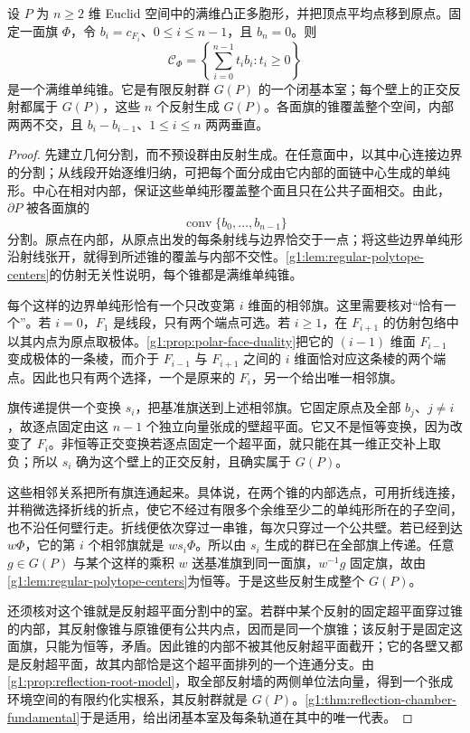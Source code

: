 \begin{theorem}
	\label{g1:thm:regular-polytope-flag-chambers}
	设 \(P\) 为 \(n\ge2\) 维 Euclid 空间中的满维凸正多胞形，并把顶点平均点移到原点。固定一面旗 \(\Phi\)，令 \(b_i=c_{F_i}\)、\(0\le i\le n-1\)，且 \(b_n=0\)。则
	\[
		\mathcal C_\Phi=\left\{\sum_{i=0}^{n-1}t_i b_i:t_i\ge0\right\}
	\]
	是一个满维单纯锥。它是有限反射群 \(G(P)\) 的一个闭基本室；每个壁上的正交反射都属于 \(G(P)\)，这些 \(n\) 个反射生成 \(G(P)\)。各面旗的锥覆盖整个空间，内部两两不交，且 \(b_i-b_{i-1}\)、\(1\le i\le n\) 两两垂直。
\end{theorem}
\begin{proof}
	先建立几何分割，而不预设群由反射生成。在任意面中，以其中心连接边界的分割；从线段开始逐维归纳，可把每个面分成由它内部的面链中心生成的单纯形。中心在相对内部，保证这些单纯形覆盖整个面且只在公共子面相交。由此，\(\partial P\) 被各面旗的
	\[
		\operatorname{conv}\{b_0,\ldots,b_{n-1}\}
	\]
	分割。原点在内部，从原点出发的每条射线与边界恰交于一点；将这些边界单纯形沿射线张开，就得到所述锥的覆盖与内部不交性。\cref{g1:lem:regular-polytope-centers}的仿射无关性说明，每个锥都是满维单纯锥。

	每个这样的边界单纯形恰有一个只改变第 \(i\) 维面的相邻旗。这里需要核对“恰有一个”。若 \(i=0\)，\(F_1\) 是线段，只有两个端点可选。若 \(i\ge1\)，在 \(F_{i+1}\) 的仿射包络中以其内点为原点取极体。\cref{g1:prop:polar-face-duality}把它的 \((i-1)\) 维面 \(F_{i-1}\) 变成极体的一条棱，而介于 \(F_{i-1}\) 与 \(F_{i+1}\) 之间的 \(i\) 维面恰对应这条棱的两个端点。因此也只有两个选择，一个是原来的 \(F_i\)，另一个给出唯一相邻旗。

	旗传递提供一个变换 \(s_i\)，把基准旗送到上述相邻旗。它固定原点及全部 \(b_j\)、\(j\ne i\)，故逐点固定由这 \(n-1\) 个独立向量张成的壁超平面。它又不是恒等变换，因为改变了 \(F_i\)。非恒等正交变换若逐点固定一个超平面，就只能在其一维正交补上取负；所以 \(s_i\) 确为这个壁上的正交反射，且确实属于 \(G(P)\)。

	这些相邻关系把所有旗连通起来。具体说，在两个锥的内部选点，可用折线连接，并稍微选择折线的折点，使它不经过有限多个余维至少二的单纯形所在的子空间，也不沿任何壁行走。折线便依次穿过一串锥，每次只穿过一个公共壁。若已经到达 \(w\Phi\)，它的第 \(i\) 个相邻旗就是 \(ws_i\Phi\)。所以由 \(s_i\) 生成的群已在全部旗上传递。任意 \(g\in G(P)\) 与某个这样的乘积 \(w\) 送基准旗到同一面旗，\(w^{-1}g\) 固定旗，故由\cref{g1:lem:regular-polytope-centers}为恒等。于是这些反射生成整个 \(G(P)\)。

	还须核对这个锥就是反射超平面分割中的室。若群中某个反射的固定超平面穿过锥的内部，其反射像锥与原锥便有公共内点，因而是同一个旗锥；该反射于是固定这面旗，只能为恒等，矛盾。因此锥的内部不被其他反射超平面截开；它的各壁又都是反射超平面，故其内部恰是这个超平面排列的一个连通分支。由\cref{g1:prop:reflection-root-model}，取全部反射墙的两侧单位法向量，得到一个张成环境空间的有限约化实根系，其反射群就是 \(G(P)\)。\cref{g1:thm:reflection-chamber-fundamental}于是适用，给出闭基本室及每条轨道在其中的唯一代表。


\end{proof}
